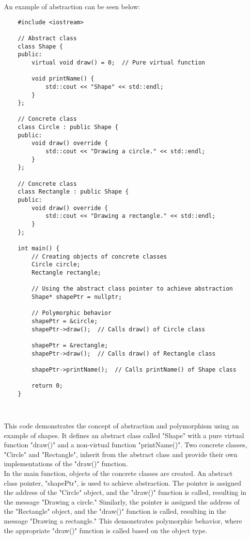 \begin{solution}
    An example of abstraction can be seen below: \\
    \horizontalline
    \begin{verbatim}
    #include <iostream>

    // Abstract class
    class Shape {
    public:
        virtual void draw() = 0;  // Pure virtual function
        
        void printName() {
            std::cout << "Shape" << std::endl;
        }
    };

    // Concrete class
    class Circle : public Shape {
    public:
        void draw() override {
            std::cout << "Drawing a circle." << std::endl;
        }
    };

    // Concrete class
    class Rectangle : public Shape {
    public:
        void draw() override {
            std::cout << "Drawing a rectangle." << std::endl;
        }
    };

    int main() {
        // Creating objects of concrete classes
        Circle circle;
        Rectangle rectangle;
        
        // Using the abstract class pointer to achieve abstraction
        Shape* shapePtr = nullptr;
        
        // Polymorphic behavior
        shapePtr = &circle;
        shapePtr->draw();  // Calls draw() of Circle class
        
        shapePtr = &rectangle;
        shapePtr->draw();  // Calls draw() of Rectangle class
        
        shapePtr->printName();  // Calls printName() of Shape class
        
        return 0;
    }
    \end{verbatim} \\
    \horizontalline

    This code demonstrates the concept of abstraction and polymorphism using an example of shapes. It defines an abstract class called "Shape" with a pure virtual function "draw()" and a non-virtual function "printName()". Two concrete classes, 
    "Circle" and "Rectangle", inherit from the abstract class and provide their own implementations of the "draw()" function. \\

    \noindent In the main function, objects of the concrete classes are created. An abstract class pointer, "shapePtr", is used to achieve abstraction. The pointer is assigned the address of the "Circle" object, and the "draw()" function is called, resulting
    in the message "Drawing a circle." Similarly, the pointer is assigned the address of the "Rectangle" object, and the "draw()" function is called, resulting in the message "Drawing a rectangle." This demonstrates polymorphic behavior, where the
    appropriate "draw()" function is called based on the object type. \\


\end{solution}
